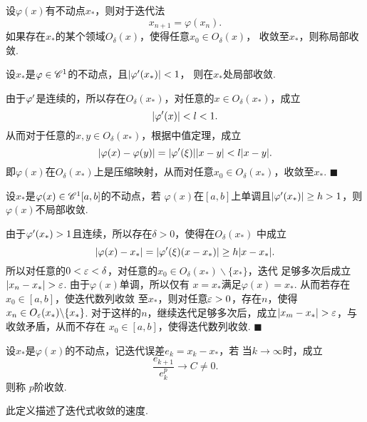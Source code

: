   \begin{defi}[局部收敛]
    设$\varphi(x)$有不动点$x_*$，则对于迭代法
    \begin{equation}
      \label{equ: 迭代法}
      x_{n+1}=\varphi(x_n).
    \end{equation}
    如果存在$x_*$的某个领域$O_\delta(x)$，使得任意$x_0\in O_\delta(x)$，
    收敛至$x_*$，则称局部收敛.
  \end{defi}

  \begin{thm}[局部收敛的条件]
    设$x_*$是$\varphi\in\mathscr{C}^1$的不动点，且$|\varphi^\prime(x_*)|<1$，
    则在$x_*$处局部收敛.
  \end{thm}
  \proof
    由于$\varphi^\prime$是连续的，所以存在$O_\delta(x_*)$，对任意的$x\in
    O_\delta(x_*)$，成立
    \[
      |\varphi^\prime(x)| < l < 1.
    \]
    从而对于任意的$x,y\in O_\delta(x_*)$，根据中值定理，成立
    \[
      |\varphi(x) - \varphi(y)| = |\varphi^\prime(\xi)||x-y| < l|x-y|.
    \]
    即$\varphi(x)$在$O_\delta(x_*)$上是压缩映射，从而对任意$x_0\in
    O_\delta(x_*)$，收敛至$x_*$. $\blacksquare$

  \begin{pos}[不局部收敛的条件]
    设$x_*$是$\varphi(x)\in\mathscr{C}^1[a, b]$的不动点，若
    $\varphi(x)$在$[a, b]$上单调且$|\varphi^\prime(x_*)|\ge h>1$，则
    $\varphi(x)$不局部收敛.
  \end{pos}
  \proof
    由于$\varphi^\prime(x_*)>1$且连续，所以存在$\delta>0$，使得在$O_\delta(x_*)$
    中成立
    \[
      |\varphi(x)-x_*| = |\varphi^\prime(\xi)(x-x_*)| \ge h|x-x_*|.
    \]
    所以对任意的$0<\varepsilon<\delta$，对任意的$x_0\in O_\delta(x_*)
    \backslash\{x_*\}$，迭代
    足够多次后成立$|x_n-x_*|>\vep$. 由于$\varphi(x)$单调，所以仅有
    $x=x_*$满足$\varphi(x)=x_*$. 从而若存在$x_0\in[a, b]$，使迭代数列收敛
    至$x_*$，则对任意$\varepsilon>0$，存在$n$，使得$x_n\in O_{\varepsilon}(x_*)\backslash\{x_*\}$.
    对于这样的$n$，继续迭代足够多次后，成立$|x_m-x_*|>\vep$，与收敛矛盾，从而不存在
    $x_0\in[a, b]$，使得迭代数列收敛. $\blacksquare$

  \begin{defi}[$p$阶收敛]
    \label{defi: p阶收敛}
    设$x_*$是$\varphi(x)$的不动点，记迭代误差$e_k=x_k-x_*$，若
    当$k\to\infty$时，成立
    \[
      \frac{e_{k+1}}{e_k^p} \to C \ne 0.
    \]
    则称 $p$阶收敛.
  \end{defi}
  \remark
    此定义描述了迭代式收敛的速度.

